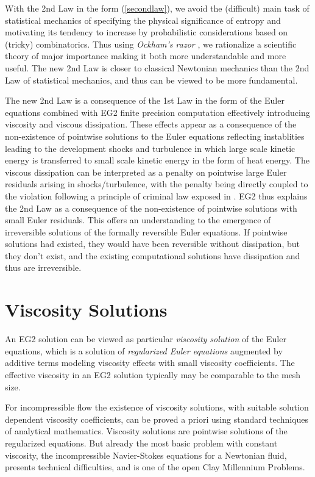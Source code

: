 With the 2nd Law in the form (\ref{secondlaw}), we avoid the
(difficult) main task of statistical mechanics of specifying the
physical significance of entropy and motivating its tendency to
increase by probabilistic considerations based on (tricky)
combinatorics. Thus using \emph{Ockham's razor} \cite{ockham}, we
rationalize a scientific theory of major importance making it both
more understandable and more useful. The new 2nd Law is closer to
classical Newtonian mechanics than the 2nd Law of statistical
mechanics, and thus can be viewed to be more fundamental.

The new 2nd Law is a consequence of the 1st Law in the form of the
Euler equations combined with EG2 finite precision computation
effectively introducing viscosity and viscous dissipation. These
effects appear as a consequence of the non-existence of pointwise
solutions to the Euler equations reflecting instablities leading to
the development shocks and turbulence in which large scale kinetic
energy is transferred to small scale kinetic energy in the form of
heat energy. The viscous dissipation can be interpreted as a penalty
on pointwise large Euler residuals arising in shocks/turbulence, with
the penalty being directly coupled to the violation following a
principle of criminal law exposed in \cite{foucault}.  EG2 thus
explains the 2nd Law as a consequence of the non-existence of
pointwise solutions with small Euler residuals.  This offers an
understanding to the emergence of irreversible solutions of the
formally reversible Euler equations.  If pointwise solutions had
existed, they would have been reversible without dissipation, but they
don't exist, and the existing computational solutions have dissipation
and thus are irreversible.

\section{Viscosity Solutions}

An EG2 solution can be viewed as particular \emph{viscosity solution}
of the Euler equations, which is a solution of \emph{regularized Euler
equations} augmented by additive terms modeling viscosity effects with
small viscosity coefficients. The effective viscosity in an EG2
solution typically may be comparable to the mesh size.

For incompressible flow the existence of viscosity solutions, with
suitable solution dependent viscosity coefficients, can be proved a
priori using standard techniques of analytical mathematics.  Viscosity
solutions are pointwise solutions of the regularized equations.  But
already the most basic problem with constant viscosity, the
incompressible Navier-Stokes equations for a Newtonian fluid, presents
technical difficulties, and is one of the open Clay Millennium
Problems.

